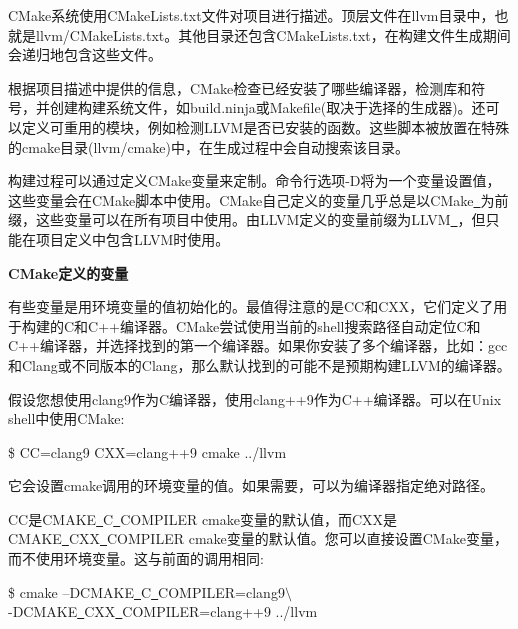 CMake系统使用CMakeLists.txt文件对项目进行描述。顶层文件在llvm目录中，也就是llvm/CMakeLists.txt。其他目录还包含CMakeLists.txt，在构建文件生成期间会递归地包含这些文件。\par

根据项目描述中提供的信息，CMake检查已经安装了哪些编译器，检测库和符号，并创建构建系统文件，如build.ninja或Makefile(取决于选择的生成器)。还可以定义可重用的模块，例如检测LLVM是否已安装的函数。这些脚本被放置在特殊的cmake目录(llvm/cmake)中，在生成过程中会自动搜索该目录。\par

构建过程可以通过定义CMake变量来定制。命令行选项-D将为一个变量设置值，这些变量会在CMake脚本中使用。CMake自己定义的变量几乎总是以CMake\underline{~}为前缀，这些变量可以在所有项目中使用。由LLVM定义的变量前缀为LLVM\underline{~}，但只能在项目定义中包含LLVM时使用。\par

\hspace*{\fill} \par %
\textbf{CMake定义的变量}

有些变量是用环境变量的值初始化的。最值得注意的是CC和CXX，它们定义了用于构建的C和C++编译器。CMake尝试使用当前的shell搜索路径自动定位C和C++编译器，并选择找到的第一个编译器。如果你安装了多个编译器，比如：gcc和Clang或不同版本的Clang，那么默认找到的可能不是预期构建LLVM的编译器。\par

假设您想使用clang9作为C编译器，使用clang++9作为C++编译器。可以在Unix shell中使用CMake:\par

\begin{tcolorbox}[colback=white,colframe=black]
\$ CC=clang9 CXX=clang++9 cmake ../llvm
\end{tcolorbox}

它会设置cmake调用的环境变量的值。如果需要，可以为编译器指定绝对路径。\par

CC是CMAKE\underline{~}C\underline{~}COMPILER cmake变量的默认值，而CXX是CMAKE\underline{~}CXX\underline{~}COMPILER cmake变量的默认值。您可以直接设置CMake变量，而不使用环境变量。这与前面的调用相同:\par

\begin{tcolorbox}[colback=white,colframe=black]
\$ cmake –DCMAKE\underline{~}C\underline{~}COMPILER=clang9$\setminus$\\
\hspace*{1cm}-DCMAKE\underline{~}CXX\underline{~}COMPILER=clang++9 ../llvm
\end{tcolorbox}

